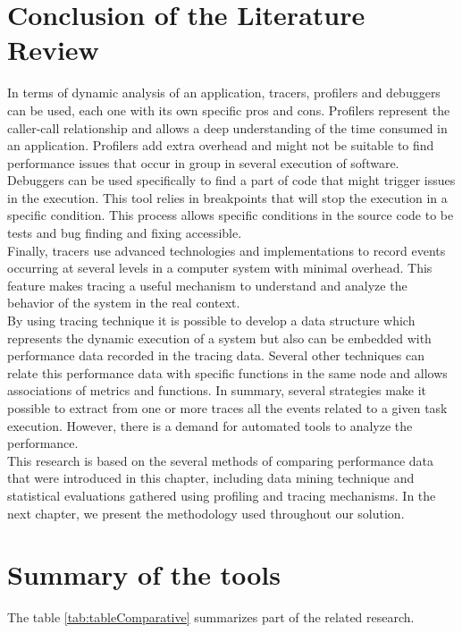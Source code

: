 \section{Conclusion of the Literature Review}
In terms of dynamic analysis of an application, tracers, profilers and debuggers can be used, each one with its own specific pros and cons.
Profilers represent the caller-call relationship and allows a deep understanding of the time consumed in an application. Profilers add extra overhead and might not be suitable to find performance issues that occur in group in several execution of software.\\
Debuggers can be used specifically to find a part of code that might trigger issues in the execution. This tool relies in breakpoints that will stop the execution in a specific condition. This process allows specific conditions in the source code to be tests and bug finding and fixing accessible. \\
Finally, tracers use advanced technologies and implementations to record events occurring at several levels in a computer system with minimal overhead. This feature makes tracing a useful mechanism to understand and analyze the behavior of the system in the real context.\\
By using tracing technique it is possible to develop a data structure which represents the dynamic execution of a system but also can be embedded with performance data recorded in the tracing data. Several other techniques can relate this performance data with specific functions in the same node and allows associations of metrics and functions.
In summary, several strategies make it possible to extract from one or more traces all the events related to a given task execution. However, there is a demand for automated tools to analyze the performance.  \\
This research is based on the several methods of comparing performance data that were introduced in this chapter, including data mining technique and statistical evaluations gathered using profiling and tracing mechanisms. In the next chapter, we present the methodology used throughout our solution.\\

\section{Summary of the tools}
The table \ref{tab:tableComparative} summarizes part of the related research.\\

